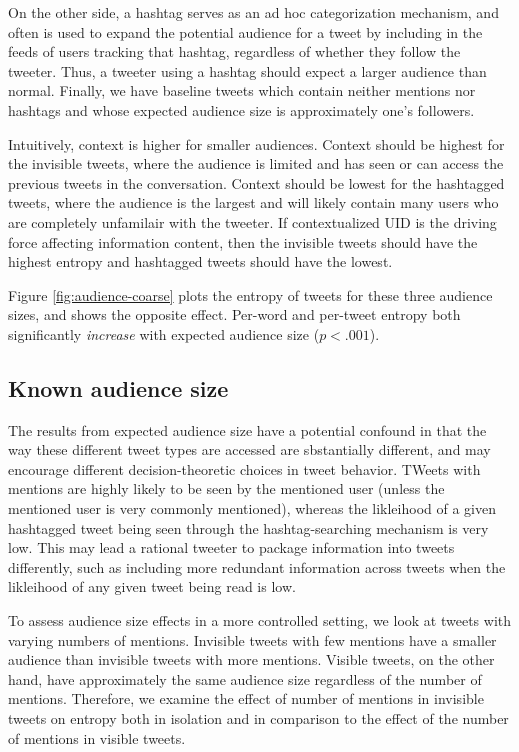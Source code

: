 \documentclass[11pt,letterpaper]{article}
\begin{document}
On the other side, a hashtag serves as an ad hoc categorization mechanism, and often is used to expand the potential audience for a tweet by including in the feeds of users tracking that hashtag, regardless of whether they follow the tweeter.  Thus, a tweeter using a hashtag should expect a larger audience than normal.  Finally, we have baseline tweets which contain neither mentions nor hashtags and whose expected audience size is approximately one's followers.

Intuitively, context is higher for smaller audiences. Context should be highest for the invisible tweets, where the audience is limited and has seen or can access the previous tweets in the conversation.  Context should be lowest for the hashtagged tweets, where the audience is the largest and will likely contain many users who are completely unfamilair with the tweeter.  If contextualized UID is the driving force affecting information content, then the invisible tweets should have the highest entropy and hashtagged tweets should have the lowest.

Figure \ref{fig:audience-coarse} plots the entropy of tweets for these three audience sizes, and shows the opposite effect.  Per-word and per-tweet entropy both significantly {\it increase} with expected audience size ($p < .001$).

\subsection{Known audience size}
The results from expected audience size have a potential confound in that the way these different tweet types are accessed are sbstantially different, and may encourage different decision-theoretic choices in tweet behavior.  TWeets with mentions are highly likely to be seen by the mentioned user (unless the mentioned user is very commonly mentioned), whereas the likleihood of a given hashtagged tweet being seen through the hashtag-searching mechanism is very low.  This may lead a rational tweeter to package information into tweets differently, such as including more redundant information across tweets when the likleihood of any given tweet being read is low.

To assess audience size effects in a more controlled setting, we look at tweets with varying numbers of mentions.  Invisible tweets with few mentions have a smaller audience than invisible tweets with more mentions.  Visible tweets, on the other hand, have approximately the same audience size regardless of the number of mentions.  Therefore, we examine the effect of number of mentions in invisible tweets on entropy both in isolation and in comparison to the effect of the number of mentions in visible tweets.
\end{document}
